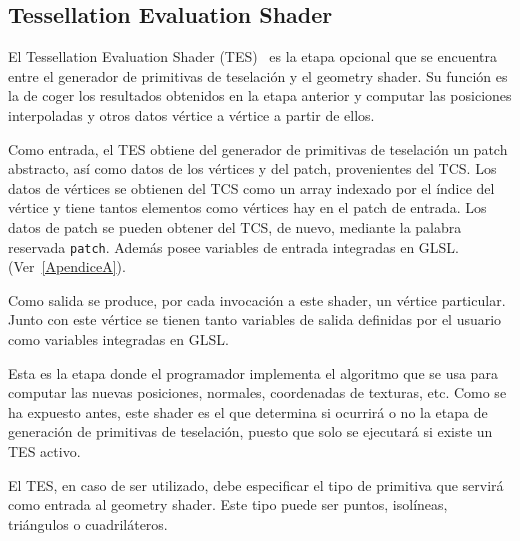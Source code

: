 \subsection{Tessellation Evaluation Shader}
\label{ref:TesEvaShader}

El Tessellation Evaluation Shader (TES)~\cite{TesEvaShader} es la etapa opcional
que se encuentra entre el generador de primitivas de teselación y el geometry
shader. Su función es la de coger los resultados obtenidos en la etapa anterior
y computar las posiciones interpoladas y otros datos vértice a vértice a partir
de ellos.

Como entrada, el TES obtiene del generador de primitivas de teselación un patch
abstracto, así como datos de los vértices y del patch, provenientes del TCS. Los
datos de vértices se obtienen del TCS como un array indexado por el índice del
vértice y tiene tantos elementos como vértices hay en el patch de entrada. Los
datos de patch se pueden obtener del TCS, de nuevo, mediante la palabra
reservada \verb|patch|. Además posee variables de entrada integradas en GLSL.
(Ver~\ref{ApendiceA}).

Como salida se produce, por cada invocación a este shader, un vértice
particular. Junto con este vértice se tienen tanto variables de salida definidas
por el usuario como variables integradas en GLSL.

Esta es la etapa donde el programador implementa el algoritmo que se usa para
computar las nuevas posiciones, normales, coordenadas de texturas, etc. Como se
ha expuesto antes, este shader es el que determina si ocurrirá o no la etapa de
generación de primitivas de teselación, puesto que solo se ejecutará si existe
un TES activo.

El TES, en caso de ser utilizado, debe especificar el tipo de primitiva que
servirá como entrada al geometry shader. Este tipo puede ser puntos, isolíneas,
triángulos o cuadriláteros.

